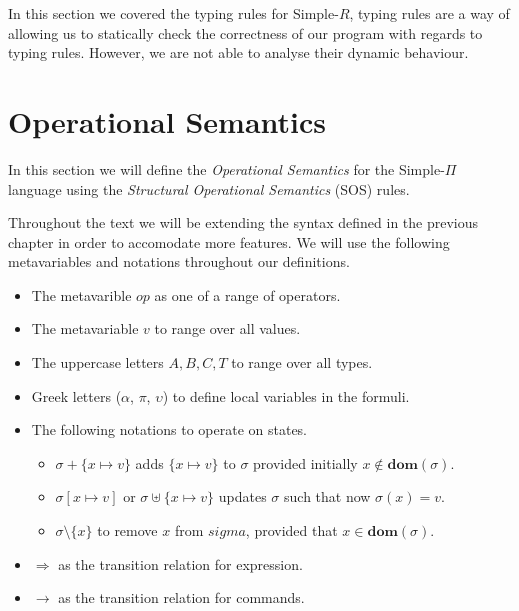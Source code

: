 \documentclass[a4paper,12pt]{report}
\begin{document}
\par
In this section we covered the typing rules for Simple-$R$, typing rules are a 
way of allowing us to statically check the correctness of our program with 
regards to typing rules. However, we are not able to analyse their dynamic 
behaviour. 

\section{Operational Semantics}
In this section we will define the \textit{Operational Semantics} 
\cite{operationalSemantics} for the Simple-$\Pi$ language 
using the \textit{Structural Operational Semantics} \cite{plotkinSOS} (SOS) rules.

\par
Throughout the text we will be extending the syntax defined in the 
previous chapter in order to accomodate more features. 
We will use the following metavariables and notations throughout our 
definitions.

\renewcommand\labelitemii{$\blacksquare$}
\begin{itemize}
  \item The metavarible $op$ as one of a range of operators. 
  \item The metavariable $v$ to range over all values.
  \item The uppercase letters $A,B,C,T$ to range over all types.
  \item Greek letters ($\alpha$, $\pi$, $\upsilon$) to define local variables in 
  the formuli. 
  \item The following notations to operate on states. 
    \begin{itemize}
      \item $\sigma + \{x \mapsto v\}$ adds $\{x \mapsto v\}$ to $\sigma$ provided initially $x \notin\textbf{dom}(\sigma)$. 
      \item $\sigma[x \mapsto v]$ or $\sigma \uplus \{x \mapsto v\}$ updates $\sigma$ such that now $\sigma(x) = v$.
      \item $\sigma \setminus \{x\}$ to remove $x$ from $sigma$, provided that $x \in \textbf{dom}(\sigma)$.
    \end{itemize}
  \item $\Longrightarrow$ as the transition relation for expression.
  \item $\longrightarrow$ as the transition relation for commands.
\end{itemize}
\end{document}
